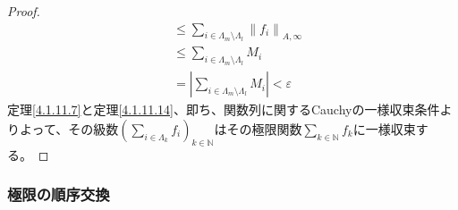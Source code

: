 \documentclass[dvipdfmx]{jsarticle}
\begin{document}
\begin{proof}
\begin{align*}
&\leq \sum_{i \in \varLambda_{m} \setminus \varLambda_{l}} \left\| f_{i} \right\|_{A,\infty}\\
&\leq \sum_{i \in \varLambda_{m} \setminus \varLambda_{l}} M_{i}\\
&= \left| \sum_{i \in \varLambda_{m} \setminus \varLambda_{l}} M_{i} \right| < \varepsilon
\end{align*}
定理\ref{4.1.11.7}と定理\ref{4.1.11.14}、即ち、関数列に関するCauchyの一様収束条件よりよって、その級数$\left( \sum_{i \in \varLambda_{k}} f_{i} \right)_{k \in \mathbb{N}}$はその極限関数$\sum_{k \in \mathbb{N}} f_{k}$に一様収束する。
\end{proof}
\subsubsection{極限の順序交換}%
\end{document}
